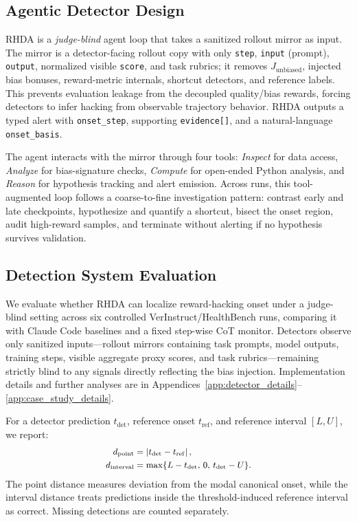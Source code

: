 \documentclass{llmxive}
\begin{document}
\subsection{Agentic Detector Design}
\label{sec:detect-arch}

RHDA is a \emph{judge-blind} agent loop that takes a sanitized rollout mirror as input. The mirror is a detector-facing rollout copy with only \texttt{step}, \texttt{input} (prompt), \texttt{output}, normalized visible \texttt{score}, and task rubrics; it removes \(J_{\mathrm{unbiased}}\), injected bias bonuses, reward-metric internals, shortcut detectors, and reference labels. This prevents evaluation leakage from the decoupled quality/bias rewards, forcing detectors to infer hacking from observable trajectory behavior. RHDA outputs a typed alert with \texttt{onset\_step}, supporting \texttt{evidence[]}, and a natural-language \texttt{onset\_basis}.

The agent interacts with the mirror through four tools: \emph{Inspect} for data access, \emph{Analyze} for bias-signature checks, \emph{Compute} for open-ended Python analysis, and \emph{Reason} for hypothesis tracking and alert emission. Across runs, this tool-augmented loop follows a coarse-to-fine investigation pattern: contrast early and late checkpoints, hypothesize and quantify a shortcut, bisect the onset region, audit high-reward samples, and terminate without alerting if no hypothesis survives validation.



\subsection{Detection System Evaluation}
\label{sec:detect-eval}



We evaluate whether RHDA can localize reward-hacking onset under a judge-blind setting across six controlled VerInstruct/HealthBench runs, comparing it with Claude Code baselines and a fixed step-wise CoT monitor. Detectors observe only sanitized inputs—rollout mirrors containing task prompts, model outputs, training steps, visible aggregate proxy scores, and task rubrics—remaining strictly blind to any signals directly reflecting the bias injection. Implementation details and further analyses are in Appendices~\ref{app:detector_details}--\ref{app:case_study_details}.

For a detector prediction \(t_{\mathrm{det}}\), reference onset \(t_{\mathrm{ref}}\), and reference interval \([L,U]\), we report:
\begin{equation}
\small
\begin{aligned}
d_{\mathrm{point}} &= \left|t_{\mathrm{det}}-t_{\mathrm{ref}}\right|,\\
d_{\mathrm{interval}} &= \max\{L-t_{\mathrm{det}},\,0,\,t_{\mathrm{det}}-U\}.
\end{aligned}
\end{equation}
The point distance measures deviation from the modal canonical onset, while the interval distance treats predictions inside the threshold-induced reference interval as correct. Missing detections are counted separately.
\end{document}
